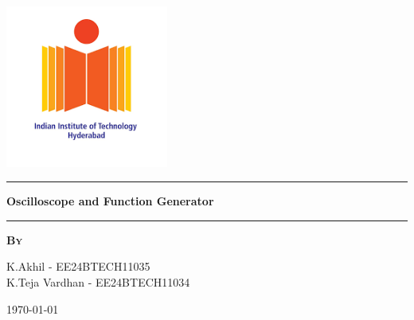 
\begin{titlepage}
\begin{center}
\vspace{2cm}
\includegraphics[width=0.4\textwidth]{root/Untitled.png}~\\[2cm]
\vspace{2cm}

\hrule
\vspace{.5cm}
{ \huge \bfseries Oscilloscope and Function Generator} %
\vspace{.5cm}

\hrule
\vspace{1.5cm}

\textsc{\textbf{By}}\\
\vspace{.5cm}
\centering

K.Akhil - EE24BTECH11035\\
K.Teja Vardhan - EE24BTECH11034\\

\vspace{4cm}

\centering \today %
\end{center}
\end{titlepage}